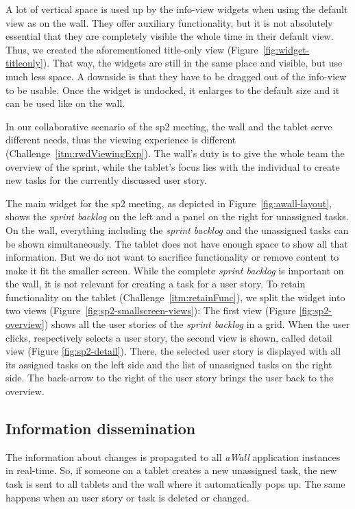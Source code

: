 \documentclass{sigchi}
\begin{document}
A lot of vertical space is used up by the info-view widgets when using the default view as on the wall.
They offer auxiliary functionality, but it is not absolutely essential that they are completely visible the whole time in their default view.
Thus, we created the aforementioned title-only view (Figure~\ref{fig:widget-titleonly}).
That way, the widgets are still in the same place and visible, but use much less space.
A downside is that they have to be dragged out of the info-view to be usable.
Once the widget is undocked, it enlarges to the default size and it can be used like on the wall.
	
In our collaborative scenario of the \gls{sp2} meeting, the wall and the tablet serve different needs, thus the viewing experience is different (Challenge~\ref{itm:rwdViewingExp}).
The wall's duty is to give the whole team the overview of the sprint, while the tablet's focus lies with the individual to create new tasks for the currently discussed user story.

The main widget for the \gls{sp2} meeting, as depicted in Figure~\ref{fig:awall-layout}, shows the \textit{sprint backlog} on the left and a panel on the right for unassigned tasks.
On the wall, everything including the \textit{sprint backlog} and the unassigned tasks can be shown simultaneously.
The tablet does not have enough space to show all that information.
But we do not want to sacrifice functionality or remove content to make it fit the smaller screen.
While the complete \textit{sprint backlog} is important on the wall, it is not relevant for creating a task for a user story.
To retain functionality on the tablet (Challenge~\ref{itm:retainFunc}), we split the widget into two views (Figure~\ref{fig:sp2-smallscreen-views}):
The first view (Figure \ref{fig:sp2-overview}) shows all the user stories of the \textit{sprint backlog} in a grid.
When the user clicks, respectively selects a user story, the second view is shown, called detail view (Figure \ref{fig:sp2-detail}).
There, the selected user story is displayed with all its assigned tasks on the left side and the list of unassigned tasks on the right side.
The back-arrow to the right of the user story brings the user back to the overview.

\subsection{Information dissemination}
The information about changes is propagated to all \textit{aWall} application instances in real-time.
So, if someone on a tablet creates a new unassigned task, the new task is sent to all tablets and the wall where it automatically pops up.
The same happens when an user story or task is deleted or changed.
\end{document}
